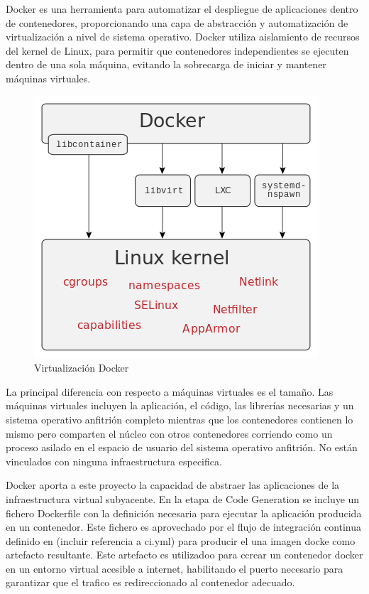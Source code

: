 \documentclass[a4paper,11pt]{book}
\begin{document}
Docker\cite{dk} es una herramienta para automatizar el despliegue de aplicaciones dentro de contenedores, proporcionando una capa de abstracción y automatización de virtualización a nivel de sistema operativo. Docker utiliza aislamiento de recursos del kernel de Linux, para permitir que contenedores independientes se ejecuten dentro de una sola máquina, evitando la sobrecarga de iniciar y mantener máquinas virtuales.

\begin{figure}[H] 
\centering 
\includegraphics[scale=0.35]{imagenes/docker.png}
\caption{ Virtualización Docker\cite{dkw}}
\end{figure}

La principal diferencia con respecto a máquinas virtuales es el tamaño. Las máquinas virtuales incluyen la aplicación, el código, las librerías necesarias y un sistema operativo anfitrión completo mientras que los contenedores contienen lo mismo pero comparten el núcleo con otros contenedores corriendo como un proceso asilado en el espacio de usuario del sistema operativo anfitrión. No están vinculados con ninguna infraestructura especifica. 

Docker aporta a este proyecto la capacidad de abstraer las aplicaciones de la infraestructura virtual subyacente. En la etapa de Code Generation se incluye un fichero Dockerfile con la definición necesaria para ejecutar la aplicación producida en un contenedor. Este fichero es aprovechado  por el flujo de integración continua definido en (incluir referencia a ci.yml)  para producir el una imagen docke como artefacto resultante. Este artefacto es utilizadoo para ccrear un contenedor docker en un entorno virtual acesible a internet, habilitando el puerto necesario para garantizar que el trafico es redireccionado al contenedor adecuado. 
\end{document}
